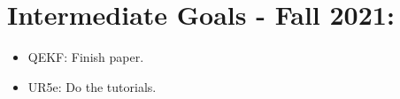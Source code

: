\documentclass[11pt]{article}
\begin{document}
\section{Intermediate Goals - Fall 2021:}
\begin{itemize}
      \item QEKF: Finish paper.
      \item UR5e: Do the tutorials.
\end{itemize}

\newpage

\newpage


\end{document}
